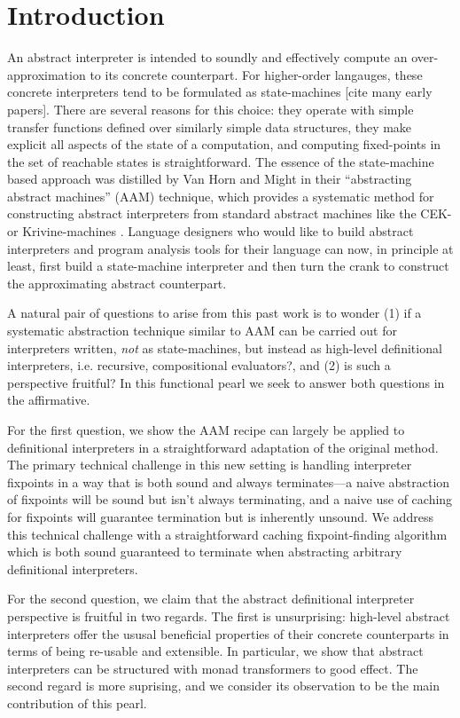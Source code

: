\section{Introduction}

An abstract interpreter is intended to soundly and effectively compute
an over-approximation to its concrete counterpart.  For higher-order
langauges, these concrete interpreters tend to be formulated as
state-machines [cite many early papers].  There are several reasons
for this choice:
 they operate with simple transfer functions defined over
  similarly simple data structures,
 they make explicit all aspects of the state of a computation,
  and
 computing fixed-points in the set of reachable states is
  straightforward.
%
The essence of the state-machine based approach was distilled by Van
Horn and Might in their ``abstracting abstract machines'' (AAM)
technique, which provides a systematic method for constructing
abstract interpreters from standard abstract machines like the CEK- or
Krivine-machines \cite{dvanhorn:VanHorn2010Abstracting}.  Language
designers who would like to build abstract interpreters and program
analysis tools for their language can now, in principle at least,
first build a state-machine interpreter and then turn the crank to
construct the approximating abstract counterpart.

A natural pair of questions to arise from this past work is to wonder
(1) if a systematic abstraction technique similar to AAM can be
carried out for interpreters written, \emph{not} as state-machines,
but instead as high-level definitional interpreters, i.e. recursive,
compositional evaluators?, and (2) is such a perspective fruitful?  In
this functional pearl we seek to answer both questions in the
affirmative.

For the first question, we show the AAM recipe can largely be applied
to definitional interpreters in a straightforward adaptation of the
original method. The primary technical challenge in this new setting
is handling interpreter fixpoints in a way that is both sound and
always terminates---a naive abstraction of fixpoints will be sound but
isn't always terminating, and a naive use of caching for fixpoints
will guarantee termination but is inherently unsound. We address this
technical challenge with a straightforward caching fixpoint-finding
algorithm which is both sound guaranteed to terminate when abstracting
arbitrary definitional interpreters.

For the second question, we claim that the abstract definitional
interpreter perspective is fruitful in two regards.  The first is
unsurprising: high-level abstract interpreters offer the ususal
beneficial properties of their concrete counterparts in terms of being
re-usable and extensible.  In particular, we show that abstract
interpreters can be structured with monad transformers to good effect.
The second regard is more suprising, and we consider its observation
to be the main contribution of this pearl.

